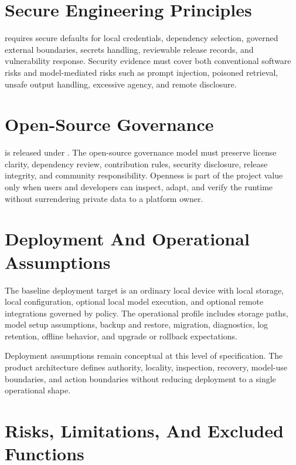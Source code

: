 \documentclass[11pt]{report}
\begin{document}

\section{Secure Engineering Principles}

\Madre requires secure defaults for local credentials, dependency selection, governed external boundaries, secrets handling, reviewable release records, and vulnerability response. Security evidence must cover both conventional software risks and model-mediated risks such as prompt injection, poisoned retrieval, unsafe output handling, excessive agency, and remote disclosure.

\section{Open-Source Governance}

\Madre is released under \texttt{\license}. The open-source governance model must preserve license clarity, dependency review, contribution rules, security disclosure, release integrity, and community responsibility. Openness is part of the project value only when users and developers can inspect, adapt, and verify the runtime without surrendering private data to a platform owner.

\section{Deployment And Operational Assumptions}

The baseline deployment target is an ordinary local device with local storage, local configuration, optional local model execution, and optional remote integrations governed by policy. The operational profile includes storage paths, model setup assumptions, backup and restore, migration, diagnostics, log retention, offline behavior, and upgrade or rollback expectations.

Deployment assumptions remain conceptual at this level of specification. The product architecture defines authority, locality, inspection, recovery, model-use boundaries, and action boundaries without reducing deployment to a single operational shape.

\section{Risks, Limitations, And Excluded Functions}
\end{document}
